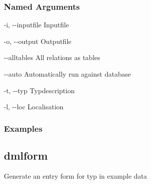 \documentclass[letterpaper,10pt,english,openany,oneside]{sphinxmanual}
\begin{document}
\subsubsection{Named Arguments}
\label{\detokenize{cmd_main:Named Arguments_repeat8}}\begin{optionlist}{3cm}
\item [-i, -{-}inputfile]  
Inputfile
\item [-o, -{-}output]  
Outputfile
\item [-{-}alltables]  
All relations as tables
\item [-{-}auto]  
Automatically run against database
\item [-t, -{-}typ]  
Typdescription
\item [-l, -{-}loc]  
Localisation
\end{optionlist}

\subsubsection{Examples}
\begin{sphinxVerbatim}[commandchars=\\\{\}]
       
\end{sphinxVerbatim}
\begin{sphinxVerbatim}[commandchars=\\\{\}]
        
\end{sphinxVerbatim}

\subsection{dmlform}
\label{\detokenize{cmd_main:dmlform}}
Generate an entry form for typ in example data

\begin{sphinxVerbatim}[commandchars=\\\{\}]
  \PYG{p}{[}\PYG{p}{]} \PYG{p}{[} \PYG{p}{]} \PYG{p}{[} \PYG{p}{]} \PYG{p}{[} \PYG{p}{]} \PYG{p}{[} \PYG{p}{]} \PYG{p}{[}\PYG{p}{]}
\end{sphinxVerbatim}
\end{document}
